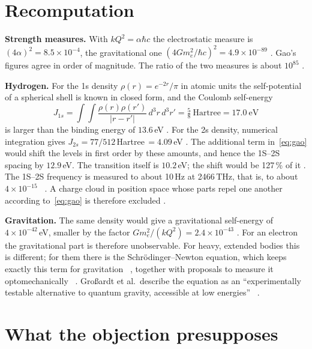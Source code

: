 \section{Recomputation}

\textbf{Strength measures.} With $kQ^2=\alpha\hbar c$ the electrostatic measure is
$(4\alpha)^2=8.5\times10^{-4}$, the gravitational one $(4Gm_e^2/\hbar c)^2=4.9\times10^{-89}$ \KM.
Gao's figures agree in order of magnitude. The ratio of the two measures is about $10^{85}$ \KM.

\textbf{Hydrogen.} For the 1s density $\rho(r)=e^{-2r}/\pi$ in atomic units the self-potential of a
spherical shell is known in closed form, and the Coulomb self-energy
\begin{equation}
  J_{1s}=\int\!\!\int\frac{\rho(r)\rho(r')}{|r-r'|}\,d^3r\,d^3r'=\tfrac58\ \text{Hartree}=17.0\ \text{eV}
\end{equation}
is larger than the binding energy of $13.6$\,eV \KM. For the 2s density, numerical integration gives
$J_{2s}=77/512$\,Hartree$\,=4.09$\,eV \KM. The additional term in~\eqref{eq:gao} would shift the levels
in first order by these amounts, and hence the 1S--2S spacing by $12.9$\,eV. The transition itself
is $10.2$\,eV; the shift would be 127\,\% of it \KM. The 1S--2S frequency is measured to about 10\,Hz
at 2466\,THz, that is, to about $4\times10^{-15}$ \QM~\cite{Parthey2011}. A charge cloud in position
space whose parts repel one another according to~\eqref{eq:gao} is therefore excluded \XM.

\textbf{Gravitation.} The same density would give a gravitational self-energy of
$4\times10^{-42}$\,eV, smaller by the factor $Gm_e^2/(kQ^2)=2.4\times10^{-43}$ \KM. For an electron
the gravitational part is therefore unobservable. For heavy, extended bodies this is different; for
them there is the Schrödinger--Newton equation, which keeps exactly this term for gravitation
\QM~\cite{Diosi1984,Penrose1996}, together with proposals to measure it optomechanically
\QM~\cite{Yang2013,Grossardt2016}. Großardt et al.\ describe the equation as an
\enquote{experimentally testable alternative to quantum gravity, accessible at low energies}
\QM~\cite{Grossardt2016}.

\section{What the objection presupposes}

